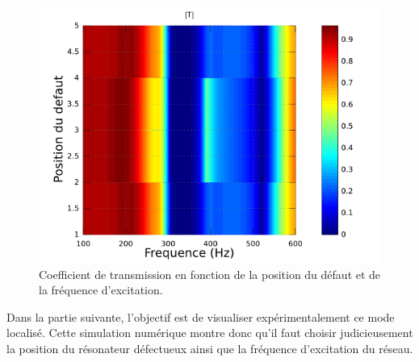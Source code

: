 \begin{figure}[!h]
	\centering
	\includegraphics[scale=0.5]{images_chp2/pos_singu.png}
	\caption{Coefficient de transmission en fonction de la position du défaut et de la fréquence d'excitation.\label{pos_singu}}
\end{figure}

Dans la partie suivante, l'objectif est de visualiser expérimentalement ce mode localisé. Cette simulation numérique montre donc qu'il faut choisir judicieusement la position du résonateur défectueux ainsi que la fréquence d'excitation du réseau.